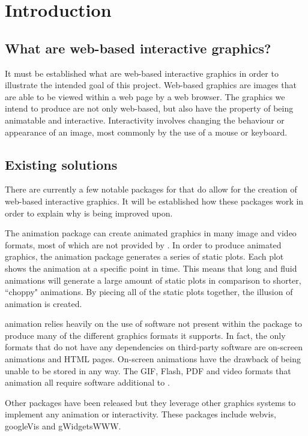 \chapter{Introduction}

\section{What are web-based interactive graphics?}

It must be established what are web-based interactive graphics in order to illustrate the intended goal of this project.
Web-based graphics are images that are able to be viewed within a web page by a web browser.
The graphics we intend to produce are not only web-based, but also have the property of being animatable and interactive.
Interactivity involves changing the behaviour or appearance of an image, most commonly by the use of a mouse or keyboard.

\section{Existing solutions}

There are currently a few notable packages for \R{} that do allow for the creation of web-based interactive graphics.
It will be established how these packages work in order to explain why \gridSVG{} is being improved upon.

The \textsf{animation} package can create animated graphics in many image and video formats, most of which are not provided by \R{}.
In order to produce animated graphics, the \textsf{animation} package generates a series of static plots.
Each plot shows the animation at a specific point in time.
This means that long and fluid animations will generate a large amount of static plots in comparison to shorter, ``choppy" animations.
By piecing all of the static plots together, the illusion of animation is created.

\textsf{animation} relies heavily on the use of software not present within the package to produce many of the different graphics formats it supports.
In fact, the only formats that do not have any dependencies on third-party software are on-screen animations and HTML pages.
On-screen animations have the drawback of being unable to be stored in any way.
The GIF, Flash, PDF and video formats that \textsf{animation} all require software additional to \R{}.

Other packages have been released but they leverage other graphics systems to implement any animation or interactivity.
These packages include \textsf{webvis}, \textsf{googleVis} and \textsf{gWidgetsWWW}.

